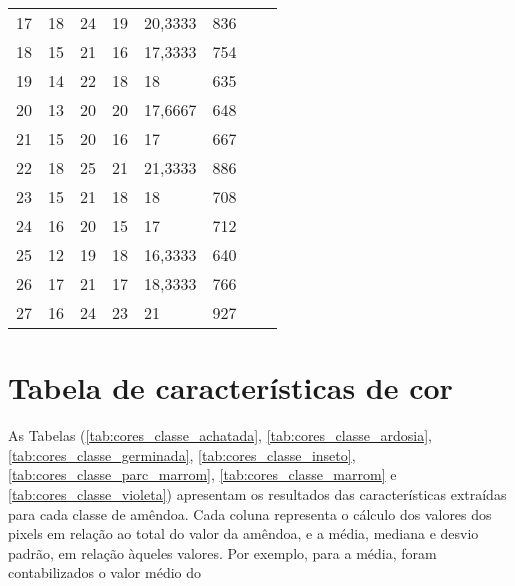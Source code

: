 \begin{anexosenv}
\begin{table}[hbtp!]
\begin{tabular}{|l|l|l|l|l|l|l|l|}
17 & 18  & 24  & 19  & 20,3333     & 836  &                  &                        \\
18 & 15  & 21  & 16  & 17,3333     & 754  &                  &                        \\
19 & 14  & 22  & 18  & 18          & 635  &                  &                        \\
20 & 13  & 20  & 20  & 17,6667     & 648  &                  &                        \\
21 & 15  & 20  & 16  & 17          & 667  &                  &                        \\
22 & 18  & 25  & 21  & 21,3333     & 886  &                  &                        \\
23 & 15  & 21  & 18  & 18          & 708  &                  &                        \\
24 & 16  & 20  & 15  & 17          & 712  &                  &                        \\
25 & 12  & 19  & 18  & 16,3333     & 640  &                  &                        \\
26 & 17  & 21  & 17  & 18,3333     & 766  &                  &                        \\
27 & 16  & 24  & 23  & 21          & 927  &                  &                       \\\hline
\end{tabular}
\end{table}

\newpage
\chapter{Tabela de características de cor}
As Tabelas (\ref{tab:cores_classe_achatada}, \ref{tab:cores_classe_ardosia}, \ref{tab:cores_classe_germinada}, \ref{tab:cores_classe_inseto}, \ref{tab:cores_classe_parc_marrom}, \ref{tab:cores_classe_marrom} e \ref{tab:cores_classe_violeta}) apresentam os resultados das características extraídas para cada classe de amêndoa. Cada coluna representa o cálculo dos valores dos pixels em relação ao total do valor da amêndoa, e a média, mediana e desvio padrão, em relação àqueles valores. Por exemplo, para a média, foram contabilizados o valor médio do \textit{}


\end{anexosenv}
